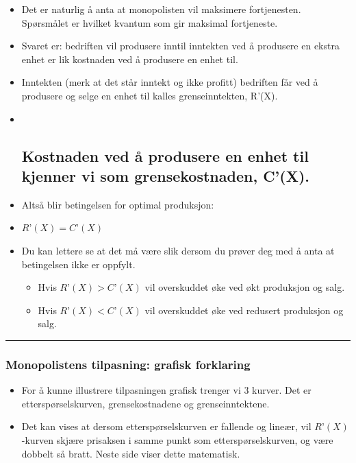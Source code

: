 \documentclass[
  letterpaper,
  DIV=11,
  numbers=noendperiod]{scrartcl}
\providecommand{\tightlist}{%
  \setlength{\itemsep}{0pt}\setlength{\parskip}{0pt}}\usepackage{longtable,booktabs,array}
\begin{document}
\begin{itemize}
\item
  Det er naturlig å anta at monopolisten vil maksimere fortjenesten.
  Spørsmålet er hvilket kvantum som gir maksimal fortjeneste.
\item
  Svaret er: bedriften vil produsere inntil inntekten ved å produsere en
  ekstra enhet er lik kostnaden ved å produsere en enhet til.
\item
  Inntekten (merk at det står inntekt og ikke profitt) bedriften får ved
  å produsere og selge en enhet til kalles grenseinntekten, R'(X).
\item ~
  \subsection{Kostnaden ved å produsere en enhet til kjenner vi som
  grensekostnaden,
  C'(X).}\label{kostnaden-ved-uxe5-produsere-en-enhet-til-kjenner-vi-som-grensekostnaden-cx.}
\item
  Altså blir betingelsen for optimal produksjon:
\item
  \(R’(X) = C’(X)\)
\item
  Du kan lettere se at det må være slik dersom du prøver deg med å anta
  at betingelsen ikke er oppfylt.

  \begin{itemize}
  \tightlist
  \item
    Hvis \(R’(X) > C’(X)\) vil overskuddet øke ved økt produksjon og
    salg.
  \item
    Hvis \(R’(X) < C’(X)\) vil overskuddet øke ved redusert produksjon
    og salg.
  \end{itemize}
\end{itemize}

\begin{center}\rule{0.5\linewidth}{0.5pt}\end{center}

\subsubsection{Monopolistens tilpasning: grafisk
forklaring}\label{monopolistens-tilpasning-grafisk-forklaring}

\begin{itemize}
\tightlist
\item
  For å kunne illustrere tilpasningen grafisk trenger vi 3 kurver. Det
  er etterspørselskurven, grensekostnadene og grenseinntektene.
\item
  Det kan vises at dersom etterspørselskurven er fallende og lineær, vil
  \(R’(X)\)-kurven skjære prisaksen i samme punkt som
  etterspørselskurven, og være dobbelt så bratt. Neste side viser dette
  matematisk.
\end{itemize}
\end{document}
